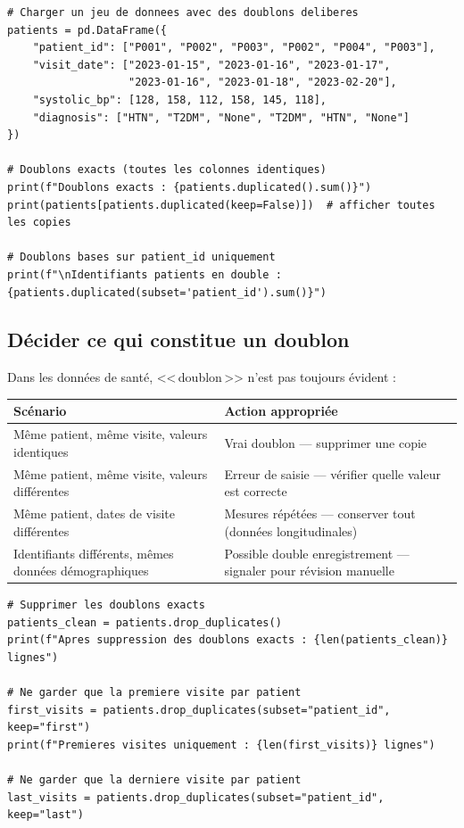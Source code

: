\begin{verbatim}
# Charger un jeu de donnees avec des doublons deliberes
patients = pd.DataFrame({
    "patient_id": ["P001", "P002", "P003", "P002", "P004", "P003"],
    "visit_date": ["2023-01-15", "2023-01-16", "2023-01-17",
                   "2023-01-16", "2023-01-18", "2023-02-20"],
    "systolic_bp": [128, 158, 112, 158, 145, 118],
    "diagnosis": ["HTN", "T2DM", "None", "T2DM", "HTN", "None"]
})

# Doublons exacts (toutes les colonnes identiques)
print(f"Doublons exacts : {patients.duplicated().sum()}")
print(patients[patients.duplicated(keep=False)])  # afficher toutes les copies

# Doublons bases sur patient_id uniquement
print(f"\nIdentifiants patients en double : {patients.duplicated(subset='patient_id').sum()}")
\end{verbatim}

\subsection{D\'ecider ce qui constitue un doublon}

Dans les donn\'ees de sant\'e, <<\,doublon\,>> n'est pas toujours \'evident :

\begin{center}
\begin{tabular}{lp{8cm}}
\toprule
\textbf{Sc\'enario} & \textbf{Action appropri\'ee} \\
\midrule
M\^eme patient, m\^eme visite, valeurs identiques & Vrai doublon --- supprimer une copie \\
M\^eme patient, m\^eme visite, valeurs diff\'erentes & Erreur de saisie --- v\'erifier quelle valeur est correcte \\
M\^eme patient, dates de visite diff\'erentes & Mesures r\'ep\'et\'ees --- conserver tout (donn\'ees longitudinales) \\
Identifiants diff\'erents, m\^emes donn\'ees d\'emographiques & Possible double enregistrement --- signaler pour r\'evision manuelle \\
\bottomrule
\end{tabular}
\end{center}

\begin{verbatim}
# Supprimer les doublons exacts
patients_clean = patients.drop_duplicates()
print(f"Apres suppression des doublons exacts : {len(patients_clean)} lignes")

# Ne garder que la premiere visite par patient
first_visits = patients.drop_duplicates(subset="patient_id", keep="first")
print(f"Premieres visites uniquement : {len(first_visits)} lignes")

# Ne garder que la derniere visite par patient
last_visits = patients.drop_duplicates(subset="patient_id", keep="last")
\end{verbatim}


